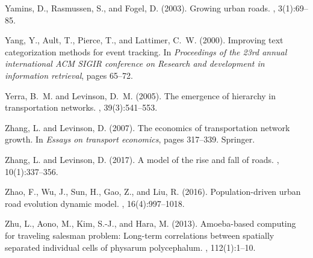 \documentclass[10pt]{article}
\begin{document}
\begin{thebibliography}{}
Yamins, D., Rasmussen, S., and Fogel, D. (2003).
\newblock Growing urban roads.
, 3(1):69--85.

Yang, Y., Ault, T., Pierce, T., and Lattimer, C.~W. (2000).
\newblock Improving text categorization methods for event tracking.
\newblock In {\em Proceedings of the 23rd annual international ACM SIGIR
  conference on Research and development in information retrieval}, pages
  65--72.

Yerra, B.~M. and Levinson, D.~M. (2005).
\newblock The emergence of hierarchy in transportation networks.
, 39(3):541--553.

Zhang, L. and Levinson, D. (2007).
\newblock The economics of transportation network growth.
\newblock In {\em Essays on transport economics}, pages 317--339. Springer.

Zhang, L. and Levinson, D. (2017).
\newblock A model of the rise and fall of roads.
, 10(1):337--356.

Zhao, F., Wu, J., Sun, H., Gao, Z., and Liu, R. (2016).
\newblock Population-driven urban road evolution dynamic model.
, 16(4):997--1018.

Zhu, L., Aono, M., Kim, S.-J., and Hara, M. (2013).
\newblock Amoeba-based computing for traveling salesman problem: Long-term
  correlations between spatially separated individual cells of physarum
  polycephalum.
, 112(1):1--10.

\end{thebibliography}
\end{document}
